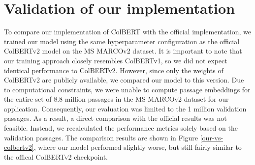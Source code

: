 \documentclass[11pt]{article}
\begin{document}
\section{Validation of our implementation}
\label{appendix:validationimplementation}
To compare our implementation of ColBERT with the official implementation, we trained our model using the same hyperparameter configuration as the official ColBERTv2 model \cite{santhanam2022colbertv2} on the MS MARCOv2 dataset. It is important to note that our training approach closely resembles ColBERTv1, so we did not expect identical performance to ColBERTv2. However, since only the weights of ColBERTv2 are publicly available, we compared our model to this version. Due to computational constraints, we were unable to compute passage embeddings for the entire set of 8.8 million passages in the MS MARCOv2 dataset for our application. Consequently, our evaluation was limited to the 1 million validation passages. As a result, a direct comparison with the official results was not feasible. Instead, we recalculated the performance metrics solely based on the validation passages. The comparison results are shown in Figure \ref{our-vs-colbertv2}, where our model performed slightly worse, but still fairly similar to the offical ColBERTv2 checkpoint.
\end{document}
